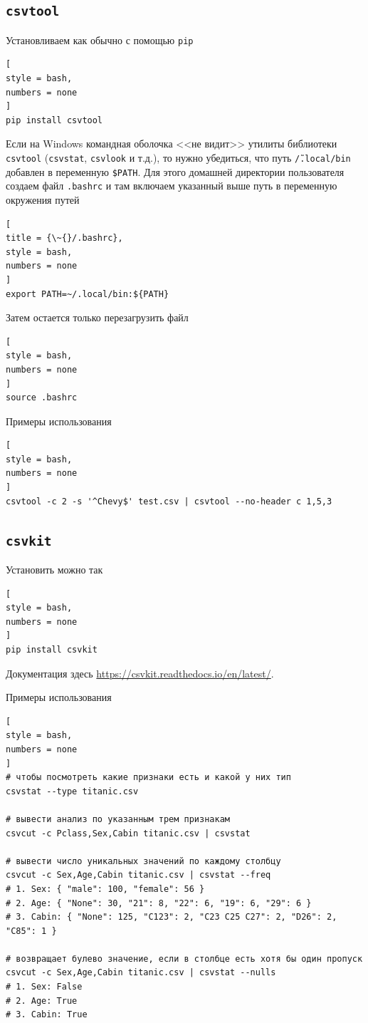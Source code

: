 \documentclass[%
	11pt,
	a4paper,
	utf8,
		]{article}
\begin{document}
\subsection{\texttt{csvtool}}

Установливаем как обычно с помощью \texttt{pip}
\begin{lstlisting}[
style = bash,
numbers = none	
]
pip install csvtool
\end{lstlisting}

Если на Windows командная оболочка <<не видит>> утилиты библиотеки \texttt{csvtool} (\texttt{csvstat}, \texttt{csvlook} и т.д.), то нужно убедиться, что путь \texttt{\~/.local/bin} добавлен в переменную \texttt{\$PATH}. Для этого домашней директории пользователя создаем файл \texttt{.bashrc} и там включаем указанный выше путь в переменную окружения путей
\begin{lstlisting}[
title = {\~{}/.bashrc},
style = bash,
numbers = none	
]
export PATH=~/.local/bin:${PATH}
\end{lstlisting}

Затем остается только перезагрузить файл
\begin{lstlisting}[
style = bash,
numbers = none
]
source .bashrc
\end{lstlisting}

Примеры использования
\begin{lstlisting}[
style = bash,
numbers = none	
]
csvtool -c 2 -s '^Chevy$' test.csv | csvtool --no-header c 1,5,3
\end{lstlisting}

\subsection{\texttt{csvkit}}

Установить можно так
\begin{lstlisting}[
style = bash,
numbers = none	
]
pip install csvkit
\end{lstlisting}

Документация здесь \url{https://csvkit.readthedocs.io/en/latest/}.

Примеры использования
\begin{lstlisting}[
style = bash,
numbers = none	
]
# чтобы посмотреть какие признаки есть и какой у них тип
csvstat --type titanic.csv

# вывести анализ по указанным трем признакам
csvcut -c Pclass,Sex,Cabin titanic.csv | csvstat

# вывести число уникальных значений по каждому столбцу
csvcut -c Sex,Age,Cabin titanic.csv | csvstat --freq
# 1. Sex: { "male": 100, "female": 56 }
# 2. Age: { "None": 30, "21": 8, "22": 6, "19": 6, "29": 6 }
# 3. Cabin: { "None": 125, "C123": 2, "C23 C25 C27": 2, "D26": 2, "C85": 1 }

# возвращает булево значение, если в столбце есть хотя бы один пропуск
csvcut -c Sex,Age,Cabin titanic.csv | csvstat --nulls
# 1. Sex: False
# 2. Age: True
# 3. Cabin: True
\end{lstlisting}
\end{document}
